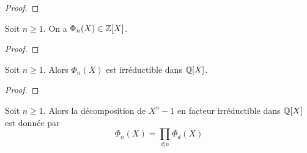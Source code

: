 \ifdefined\outputproof
\begin{proof}

\end{proof}
\fi

\begin{proposition}
	Soit $n \geq 1$. On a $\Phi_{n} (X) \in \mathbb{Z}[X]$.
\end{proposition}

\ifdefined\outputproof
\begin{proof}

\end{proof}
\fi

\begin{theorem}
	Soit $n \geq 1$. Alors $\Phi_{n}(X)$ est irréductible dans $\mathbb{Q}[X]$.
\end{theorem}

\ifdefined\outputproof
\begin{proof}

\end{proof}
\fi

\begin{proposition}
	Soit $n \geq 1$. Alors la décomposition de $X^{n} - 1$ en facteur
	irréductible dans $\mathbb{Q}[X]$ est donnée par
	\begin{equation}
		\Phi_{n}(X) = \prod_{d | n} \Phi_{d}(X)
	\end{equation}
\end{proposition}
